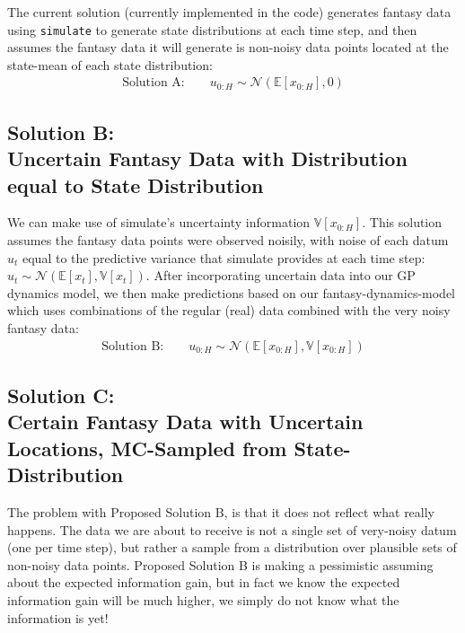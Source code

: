 \documentclass[a4paper,10pt]{article}
\newcommand{\N}{\mathcal{N}}
\newcommand{\E}{\mathbb{E}}
\newcommand{\V}{\mathbb{V}}
\begin{document}
The current solution (currently implemented in the code) generates fantasy
data using {\tt simulate} to generate state distributions at each time step,
and then assumes the fantasy data it will generate is non-noisy data points located at the state-mean
of each state distribution:
\begin{eqnarray}
 \text{Solution A:} \quad\quad u_{0:H} \sim \N(\E[x_{0:H}],0)
\end{eqnarray}

\subsection{Solution B: \\ \small{Uncertain Fantasy Data with Distribution equal to State Distribution}}

We can make use of simulate's uncertainty information $\V[x_{0:H}]$. %
This solution assumes the fantasy data points
were observed noisily,
with noise of each datum $u_t$
equal to the predictive variance that simulate provides at each time step: $u_t\sim\N(\E[x_t],\V[x_t])$.
After incorporating uncertain data into our GP dynamics model,
we then make predictions based on our fantasy-dynamics-model
which uses combinations of the regular (real) data combined with the very noisy fantasy data:
\begin{eqnarray}
 \text{Solution B:} \quad\quad u_{0:H} \sim \N(\E[x_{0:H}],\V[x_{0:H}])
\end{eqnarray}

\subsection{Solution C: \\ \small{Certain Fantasy Data with Uncertain Locations, MC-Sampled from State-Distribution}}

The problem with Proposed Solution B, is that it does not reflect what really happens.
The data we are about to receive is not a single set of
very-noisy datum (one per time step), but rather a sample from a distribution over plausible sets
of non-noisy data points.
Proposed Solution B is making a pessimistic assuming about the expected information gain,
but in fact we know the expected information gain will be much higher,
we simply do not know what the information is yet!
\end{document}
